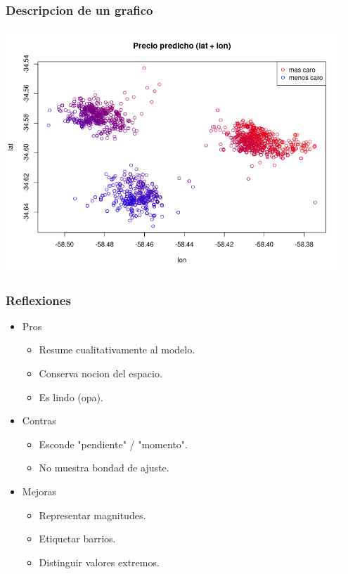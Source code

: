 \documentclass{beamer}
\begin{document}
\begin{frame}
\frametitle{Descripcion de un grafico}
\includegraphics[width=0.95\textwidth]{grafico.png}
\end{frame}

\begin{frame}
\frametitle{Reflexiones}
\begin{itemize}
\item Pros
    \begin{itemize}
    \item Resume cualitativamente al modelo.
    \item Conserva nocion del espacio.
    \item Es lindo (opa).
    \end{itemize}
\item Contras
    \begin{itemize}
    \item Esconde "pendiente" / "momento".
    \item No muestra bondad de ajuste.
    \end{itemize}
\item Mejoras
    \begin{itemize}
    \item Representar magnitudes.
    \item Etiquetar barrios.
    \item Distinguir valores extremos.
    \end{itemize}
\end{itemize}
\end{frame}
\end{document}
